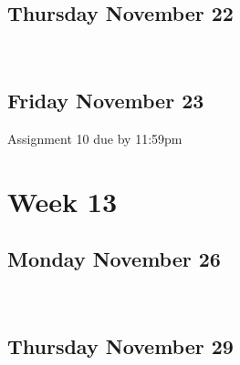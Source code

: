 \documentclass[]{book}
\let\originaltabular\tabular
\let\endoriginaltabular\endtabular
\renewenvironment{tabular}[1]{%
  \begingroup%
  \centering%
  \originaltabular{#1}}%
  {\endoriginaltabular\endgroup}
\theoremstyle{definition}
\theoremstyle{definition}
\theoremstyle{definition}
\theoremstyle{remark}
\begin{document}
\subsection{Thursday November 22}\label{thursday-november-22}

\begin{table}[H]
\centering
\begin{tabular}{l}
\hline
\\
\hline
\end{tabular}
\end{table}

\subsection{Friday November 23}\label{friday-november-23}

\begin{table}[H]
\centering
\begin{tabular}{l}
\hline
Assignment 10 due by 11:59pm\\
\hline
\end{tabular}
\end{table}

\section{Week 13}\label{week-13}

\subsection{Monday November 26}\label{monday-november-26}

\begin{table}[H]
\centering
\begin{tabular}{l}
\hline
\\
\hline
\end{tabular}
\end{table}

\subsection{Thursday November 29}\label{thursday-november-29}

\begin{table}[H]
\centering
\begin{tabular}{l}
\hline
\\
\hline
\end{tabular}
\end{table}
\end{document}
